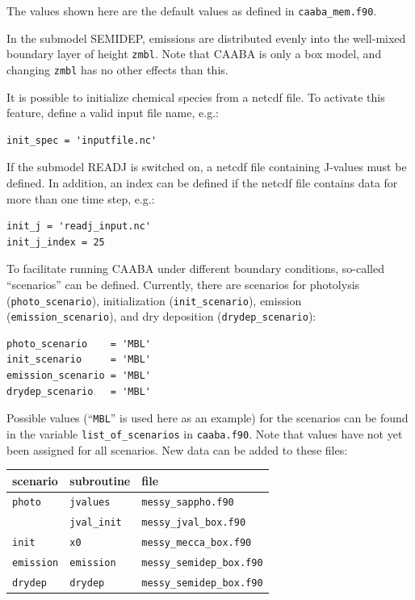\documentclass[twoside]{article}
\begin{document}
The values shown here are the default values as defined in
\verb|caaba_mem.f90|.

In the submodel SEMIDEP, emissions are distributed evenly into the
well-mixed boundary layer of height \verb|zmbl|. Note that CAABA is only
a box model, and changing \verb|zmbl| has no other effects than this.

It is possible to initialize chemical species from a netcdf file. To
activate this feature, define a valid input file name, e.g.:

\begin{verbatim}
init_spec = 'inputfile.nc'
\end{verbatim}

If the submodel READJ is switched on, a netcdf file containing J-values
must be defined. In addition, an index can be defined if the netcdf file
contains data for more than one time step, e.g.:

\begin{verbatim}
init_j = 'readj_input.nc'
init_j_index = 25
\end{verbatim}

To facilitate running CAABA under different boundary conditions,
so-called ``scenarios'' can be defined. Currently, there are scenarios
for photolysis (\verb|photo_scenario|), initialization
(\verb|init_scenario|), emission (\verb|emission_scenario|), and dry
deposition (\verb|drydep_scenario|):

\begin{verbatim}
photo_scenario    = 'MBL'
init_scenario     = 'MBL'
emission_scenario = 'MBL'
drydep_scenario   = 'MBL'
\end{verbatim}

Possible values (``\verb|MBL|'' is used here as an example) for the
scenarios can be found in the variable \verb|list_of_scenarios| in
\verb|caaba.f90|. Note that values have not yet been assigned for all
scenarios. New data can be added to these files:

\begin{center}  
  \begin{tabular}{lll}
    \hline
    scenario & subroutine & file\\
    \hline
    \verb|photo|    & \verb|jvalues| & \verb|messy_sappho.f90|\\
                    & \verb|jval_init| & \verb|messy_jval_box.f90|\\
    \verb|init|     & \verb|x0| & \verb|messy_mecca_box.f90|\\
    \verb|emission| & \verb|emission| & \verb|messy_semidep_box.f90|\\
    \verb|drydep|   & \verb|drydep| & \verb|messy_semidep_box.f90|\\
    \hline
  \end{tabular}
\end{center}
\end{document}
